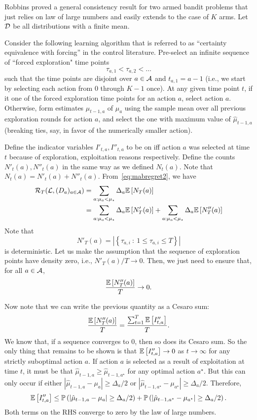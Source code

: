 \documentclass[11pt]{article}
\begin{document}
Robbins \cite{robbins1952some} proved a general consistency result for two armed bandit problems that just relies on law of large numbers and easily extends to the case of $K$ arms.
Let $\mathcal{D}$ be all distributions with a finite mean.

Consider the following learning algorithm that is referred to as ``certainty equivalence with forcing'' in the control literature. Pre-select an infinite sequence of ``forced exploration" time points
\[
\tau_{a,1} < \tau_{a,2} < \ldots
\]
such that the time points are disjoint over $a \in \mathcal{A}$ and $t_{a,1} = a-1$ (i.e., we start by selecting each action from $0$ through $K-1$ once). At any given time point $t$, if it one
of the forced exploration time points for an action $a$, select action $a$. Otherwise, form estimates $\hat{\mu}_{t-1,a}$ of $\mu_a$ using the sample mean over all previous exploration rounds for action $a$, and select the
one with maximum value of $\hat{\mu}_{t-1,a}$ (breaking ties, say, in favor of the numerically smaller action).

Define the indicator variables $I'_{t,a}, I''_{t,a}$ to be on iff action $a$ was selected at time $t$ because of exploration, exploitation reasons respectively. Define the counts $N'_t(a), N''_t(a)$ in the same way as we defined
$N_t(a)$. Note that $N_t(a) = N'_t(a) + N''_t(a)$. From~\eqref{eq:mabregret2}, we have
\begin{align*}
\mathcal{R}_T(\mathcal{L}, (D_a)_{a \in \mathcal{A}}) &= \sum_{a: \mu_a < \mu_\star} \Delta_a \mathbb{E}\left[ N_T(a) \right] \\
&= \sum_{a: \mu_a < \mu_\star} \Delta_a \mathbb{E}\left[ N'_T(a) \right] + \sum_{a: \mu_a < \mu_\star} \Delta_a \mathbb{E}\left[ N''_T(a) \right] 
\end{align*}
Note that
\[
N'_T(a) = |\left\{ \tau_{a,i} \::\: 1 \le \tau_{a,i} \le T \right\}|
\]
is deterministic. Let us make the assumption that the sequence of exploration points have density zero, i.e., $N'_T(a)/T \to 0$. Then, we just need to ensure that, for all $a \in \mathcal{A}$,
\[
\frac{ \mathbb{E}\left[ N''_T(a) \right] }{T} \to 0 .
\]

Now note that we can write the previous quantity as a Cesaro sum:
\[
\frac{ \mathbb{E}\left[ N''_T(a) \right] }{T} = \frac{\sum_{t=1}^T \mathbb{E}\left[ I''_{t,a} \right]} {T} .
\]
We know that, if a sequence converges to $0$, then so does its Cesaro sum. So the only thing that remains to be shown is that $\mathbb{E}\left[ I''_{t,a} \right] \to 0$ as $t \to \infty$ for any 
strictly suboptimal action $a$. If action $a$ is selected as a result of exploitation at time $t$, it must be that $\hat{\mu}_{t-1,a} \ge \hat{\mu}_{t-1,a^\star}$ for any optimal
action $a^\star$. But this can only occur if either $|\hat{\mu}_{t-1,a} - \mu_a| \ge \Delta_a/2$ or $|\hat{\mu}_{t-1,a^\star} - \mu_{a^\star}| \ge \Delta_a/2$. Therefore,
\[
\mathbb{E}\left[ I''_{t,a} \right] \le \mathbb{P}\left( |\hat{\mu}_{t-1,a} - \mu_a| \ge \Delta_a/2 \right) + \mathbb{P}\left( |\hat{\mu}_{t-1,a^\star} - \mu_{a^\star}| \ge \Delta_a/2 \right) .
\]
Both terms on the RHS converge to zero by the law of large numbers.


\end{document}
